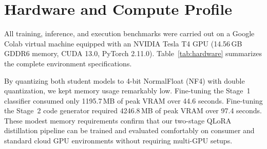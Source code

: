 \documentclass[journal]{IEEEtran}
\begin{document}
\section{Hardware and Compute Profile}
All training, inference, and execution benchmarks were carried out on a Google Colab virtual machine equipped with an NVIDIA Tesla T4 GPU (14.56\,GB GDDR6 memory, CUDA 13.0, PyTorch 2.11.0). Table~\ref{tab:hardware} summarizes the complete environment specifications.

\begin{table}[!t]
\caption{System Hardware and Software Configuration}
\label{tab:hardware}
\centering
{}
\end{table}

By quantizing both student models to 4-bit NormalFloat (NF4) with double quantization, we kept memory usage remarkably low. Fine-tuning the Stage~1 classifier consumed only 1195.7\,MB of peak VRAM over 44.6 seconds. Fine-tuning the Stage~2 code generator required 4246.8\,MB of peak VRAM over 97.4 seconds. These modest memory requirements confirm that our two-stage QLoRA distillation pipeline can be trained and evaluated comfortably on consumer and standard cloud GPU environments without requiring multi-GPU setups.
\end{document}
